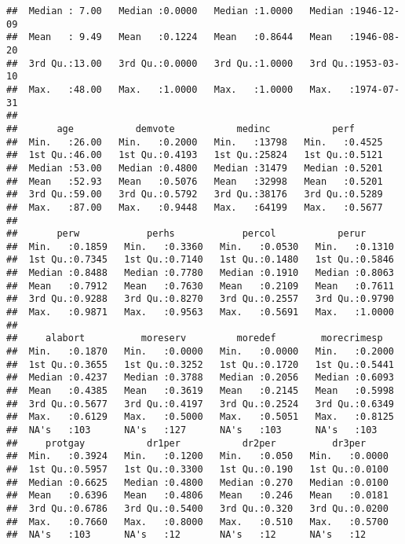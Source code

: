 \documentclass[
]{article}
\begin{document}
\begin{verbatim}
##  Median : 7.00   Median :0.0000   Median :1.0000   Median :1946-12-09  
##  Mean   : 9.49   Mean   :0.1224   Mean   :0.8644   Mean   :1946-08-20  
##  3rd Qu.:13.00   3rd Qu.:0.0000   3rd Qu.:1.0000   3rd Qu.:1953-03-10  
##  Max.   :48.00   Max.   :1.0000   Max.   :1.0000   Max.   :1974-07-31  
##                                                                        
##       age           demvote           medinc           perf       
##  Min.   :26.00   Min.   :0.2000   Min.   :13798   Min.   :0.4525  
##  1st Qu.:46.00   1st Qu.:0.4193   1st Qu.:25824   1st Qu.:0.5121  
##  Median :53.00   Median :0.4800   Median :31479   Median :0.5201  
##  Mean   :52.93   Mean   :0.5076   Mean   :32998   Mean   :0.5201  
##  3rd Qu.:59.00   3rd Qu.:0.5792   3rd Qu.:38176   3rd Qu.:0.5289  
##  Max.   :87.00   Max.   :0.9448   Max.   :64199   Max.   :0.5677  
##                                                                   
##       perw            perhs            percol           perur       
##  Min.   :0.1859   Min.   :0.3360   Min.   :0.0530   Min.   :0.1310  
##  1st Qu.:0.7345   1st Qu.:0.7140   1st Qu.:0.1480   1st Qu.:0.5846  
##  Median :0.8488   Median :0.7780   Median :0.1910   Median :0.8063  
##  Mean   :0.7912   Mean   :0.7630   Mean   :0.2109   Mean   :0.7611  
##  3rd Qu.:0.9288   3rd Qu.:0.8270   3rd Qu.:0.2557   3rd Qu.:0.9790  
##  Max.   :0.9871   Max.   :0.9563   Max.   :0.5691   Max.   :1.0000  
##                                                                     
##     alabort          moreserv         moredef        morecrimesp    
##  Min.   :0.1870   Min.   :0.0000   Min.   :0.0000   Min.   :0.2000  
##  1st Qu.:0.3655   1st Qu.:0.3252   1st Qu.:0.1720   1st Qu.:0.5441  
##  Median :0.4237   Median :0.3788   Median :0.2056   Median :0.6093  
##  Mean   :0.4385   Mean   :0.3619   Mean   :0.2145   Mean   :0.5998  
##  3rd Qu.:0.5677   3rd Qu.:0.4197   3rd Qu.:0.2524   3rd Qu.:0.6349  
##  Max.   :0.6129   Max.   :0.5000   Max.   :0.5051   Max.   :0.8125  
##  NA's   :103      NA's   :127      NA's   :103      NA's   :103     
##     protgay           dr1per           dr2per          dr3per      
##  Min.   :0.3924   Min.   :0.1200   Min.   :0.050   Min.   :0.0000  
##  1st Qu.:0.5957   1st Qu.:0.3300   1st Qu.:0.190   1st Qu.:0.0100  
##  Median :0.6625   Median :0.4800   Median :0.270   Median :0.0100  
##  Mean   :0.6396   Mean   :0.4806   Mean   :0.246   Mean   :0.0181  
##  3rd Qu.:0.6786   3rd Qu.:0.5400   3rd Qu.:0.320   3rd Qu.:0.0200  
##  Max.   :0.7660   Max.   :0.8000   Max.   :0.510   Max.   :0.5700  
##  NA's   :103      NA's   :12       NA's   :12      NA's   :12      

\end{verbatim}
\end{document}
